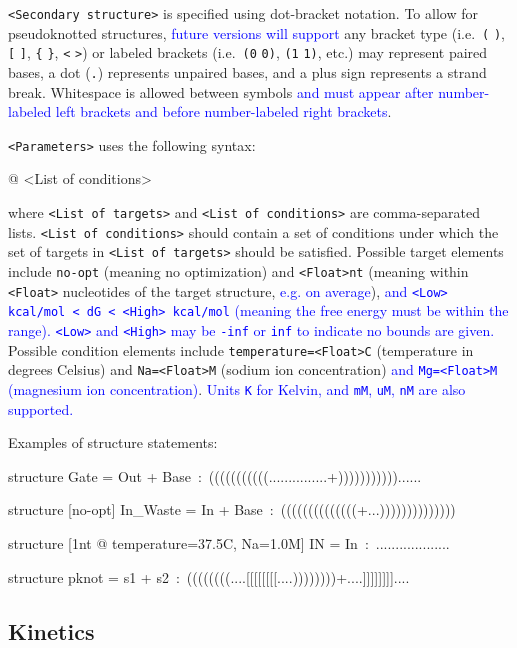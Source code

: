 \documentclass{article}
\newcommand{\add}[1]{\textcolor{blue}{#1}}
\newenvironment{code}
{\vspace{-0.1in}\par\begin{list}{}{
\setlength{\listparindent}{0pt}
\raggedright
\setlength{\itemsep}{0pt}
\setlength{\parsep}{0pt}
\normalfont\ttfamily}
 \item[]}
{\end{list}\vspace{-0.1in}}
\begin{document}
\texttt{<Secondary structure>} is specified using dot-bracket
notation. To allow for pseudoknotted structures, \add{future versions will support} any bracket type (i.e.\ \texttt{(} \texttt{)}, \texttt{[} \texttt{]}, \texttt{\{} \texttt{\}}, \texttt{<} \texttt{>}) or labeled brackets (i.e.\ \texttt{(0} \texttt{0)}, \texttt{(1} \texttt{1)}, etc.) may represent paired bases, a dot (\texttt{.}) represents unpaired bases, and a plus sign represents a strand break. Whitespace is allowed between symbols \add{and must appear after number-labeled left brackets and before number-labeled right brackets}. 

\texttt{<Parameters>} uses the following syntax:
\begin{code}
<List of targets> \textsf{@} <List of conditions>
\end{code}
where \texttt{<List of targets>} and \texttt{<List of conditions>} are
comma-separated lists. \texttt{<List of conditions>} should contain a
set of conditions under which the set of targets in \texttt{<List of
targets>} should be satisfied. Possible target elements include
\texttt{no-opt} (meaning no optimization) and \texttt{<Float>nt}
(meaning within \texttt{<Float>} nucleotides of the target
structure, \add{e.g. on average}), \add{and \texttt{<Low> kcal/mol < dG < <High> kcal/mol} (meaning the free energy must be within the range).
\texttt{<Low>} and \texttt{<High>} may be \texttt{-inf} or \texttt{inf} to indicate no bounds are given. }
Possible condition elements include
\texttt{temperature=<Float>C} (temperature in degrees Celsius) and
\texttt{Na=<Float>M} (sodium ion concentration) \add{and
\texttt{Mg=<Float>M} (magnesium ion concentration)}.
\add{Units \texttt{K} for Kelvin, and \texttt{mM}, \texttt{uM}, \texttt{nM} are also supported.}


Examples of structure statements:
\begin{code}
structure Gate = Out + Base~:~(((((((((((...............+)))))))))))......

structure [no-opt] In\_Waste = In + Base~:~((((((((((((((+...))))))))))))))

structure [1nt \textsf{@} temperature=37.5C, Na=1.0M] IN = In~:~...................

structure pknot = s1 + s2~:~((((((((....[[[[[[[[....))))))))+....]]]]]]]]....
\end{code}

\subsection{Kinetics}
\end{document}
